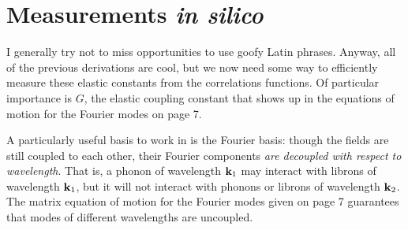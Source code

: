 \documentclass[12pt]{article}
\begin{document}
\section{Measurements \emph{in silico}}

I generally try not to miss opportunities to use goofy Latin phrases. Anyway, all of the previous derivations are cool, but we now need some way to efficiently measure these elastic constants from the correlations functions. Of particular importance is $G$, the elastic coupling constant that shows up in the equations of motion for the Fourier modes on page 7.

A particularly useful basis to work in is the Fourier basis: though the fields are still coupled to each other, their Fourier components \emph{are decoupled with respect to wavelength}. That is, a phonon of wavelength $\mathbf{k}_1$ may interact with librons of wavelength $\mathbf{k}_1$, but it will not interact with phonons or librons of wavelength $\mathbf{k}_2$. The matrix equation of motion for the Fourier modes given on page 7 guarantees that modes of different wavelengths are uncoupled.
\end{document}
